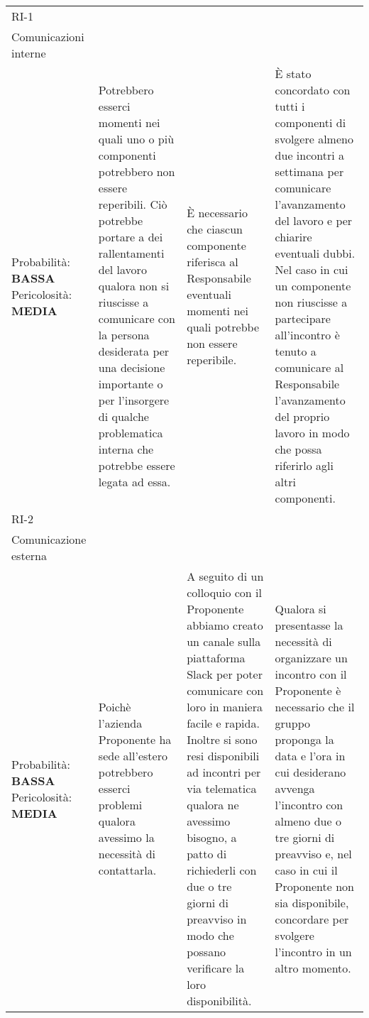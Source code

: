 \begin{longtable}{
		>{\centering}p{}
		>{\centering}p{}
		>{\centering}p{}
		>{\centering\arraybackslash}p{} }
	\rowcolor{darkRowColor}
	RI-1 \\ Comunicazioni interne \\
		\vspace{5mm} %
		Probabilità: \textbf{BASSA} Pericolosità: \textbf{MEDIA} &
		Potrebbero esserci momenti nei quali uno o più componenti potrebbero non essere reperibili. Ciò potrebbe portare a dei rallentamenti del lavoro qualora non si riuscisse a comunicare con la persona desiderata per una decisione importante o per l'insorgere di qualche problematica interna che potrebbe essere legata ad essa.
		&
		È necessario che ciascun componente riferisca al Responsabile eventuali momenti nei quali potrebbe non essere reperibile.
		&
		È stato concordato con tutti i componenti di svolgere almeno due incontri a settimana per comunicare l'avanzamento del lavoro e per chiarire eventuali dubbi. Nel caso in cui un componente non riuscisse a partecipare all'incontro è tenuto a comunicare al Responsabile l'avanzamento del proprio lavoro in modo che possa riferirlo agli altri componenti. \\

	\rowcolor{lightRowColor}
	RI-2 \\ Comunicazione esterna \\
		\vspace{5mm} %
		Probabilità: \textbf{BASSA} Pericolosità: \textbf{MEDIA} &
		Poichè l'azienda Proponente\ped{\textit{G}} ha sede all'estero potrebbero esserci problemi qualora avessimo la necessità di contattarla.
		&
		A seguito di un colloquio con il Proponente\ped{\textit{G}} abbiamo creato un canale sulla piattaforma Slack\ped{\textit{G}} per poter comunicare con loro in maniera facile e rapida. Inoltre si sono resi disponibili ad incontri per via telematica qualora ne avessimo bisogno, a patto di richiederli con due o tre giorni di preavviso in modo che possano verificare la loro disponibilità.
		&
		Qualora si presentasse la necessità di organizzare un incontro con il Proponente\ped{\textit{G}} è necessario che il gruppo proponga la data e l'ora in cui desiderano avvenga l'incontro con almeno due o tre giorni di preavviso e, nel caso in cui il Proponente\ped{\textit{G}} non sia disponibile, concordare per svolgere l'incontro in un altro momento. \\


\end{longtable}
